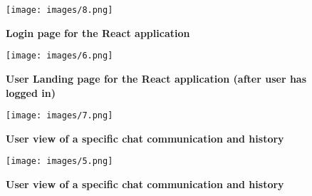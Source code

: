 \documentclass[12pt]{article}
\begin{document}
\begin{figure}[h!]
    \centering
    \texttt{[image: images/8.png]}
    \caption{\textbf{Login page for the React application}}
    \label{fig:my_label4}
\end{figure}

\newpage 
\begin{figure}[h!]
    \centering
    \texttt{[image: images/6.png]}
    \caption{\textbf{User Landing page for the React application (after user has logged in)}}
    \label{fig:my_label5}
\end{figure}

\begin{figure}[h!]
    \centering
    \texttt{[image: images/7.png]}
    \caption{\textbf{User view of a specific chat communication and history}}
    \label{fig:my_label5}
\end{figure}

\newpage 
\begin{figure}[h!]
    \centering
    \texttt{[image: images/5.png]}
    \caption{\textbf{User view of a specific chat communication and history}}
    \label{fig:my_label5}
\end{figure}


\newpage 
\end{document}
